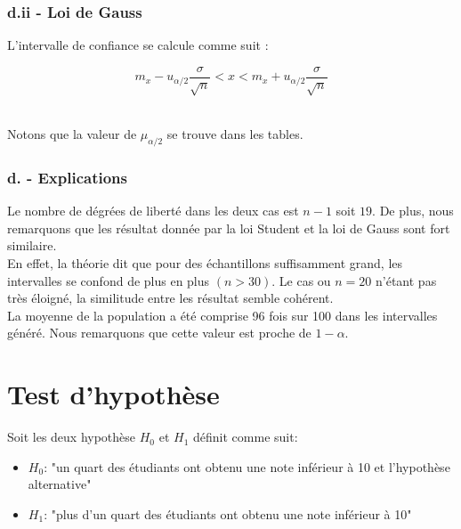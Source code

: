 \documentclass[10pt,a4paper]{article}
\begin{document}
\subsubsection*{d.ii - Loi de Gauss}
L'intervalle de confiance se calcule comme suit : 
\begin{center}
\[ m_x - u_{\alpha/2}\frac{\sigma}{\sqrt{n}}  < x < m_x + u_{\alpha/2}\frac{\sigma}{\sqrt{n}} \]
\end{center}\\
Notons que la valeur de $\mu_{\alpha / 2}$ se trouve dans les tables.

\subsubsection*{d. - Explications}
Le nombre de dégrées de liberté dans les deux cas est $n - 1$ soit $19$. De plus, nous remarquons que les résultat donnée par la loi Student et la loi de Gauss sont fort similaire.\\

En effet, la théorie dit que pour  des échantillons suffisamment grand, les intervalles se confond de plus en plus $( n > 30 )$. Le cas ou $n = 20$ n'étant pas très éloigné, la similitude entre les résultat semble cohérent.\\

La moyenne de la population a été comprise 96 fois sur 100 dans les intervalles généré. Nous remarquons que cette valeur est proche de $1-\alpha$.\\







\section{Test d'hypothèse}
Soit les deux hypothèse $H_0$ et $H_1$ définit comme suit:

\begin{itemize}

\item $H_0$: "un quart des étudiants ont obtenu une note inférieur à 10 et l'hypothèse alternative"

\item $H_1$: "plus d'un quart des étudiants ont obtenu une note inférieur à 10"

\end{itemize}
\end{document}
